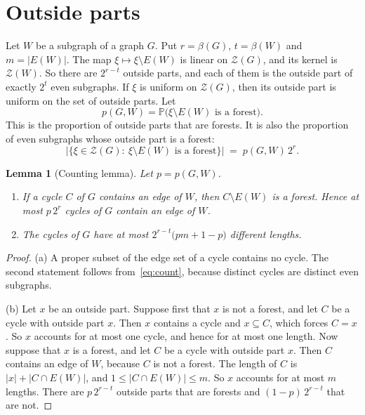 \documentclass[11pt]{article}
\newtheorem{lemma}[theorem]{Lemma}
\theoremstyle{definition}
\theoremstyle{remark}
\newcommand{\Z}{\mathcal{Z}}
\newcommand{\PP}{\mathbb{P}}
\newcommand{\sm}{\setminus}
\numberwithin{equation}{section}
\begin{document}
\section{Outside parts}\label{sec:count}

Let $W$ be a subgraph of a graph $G$. Put $r=\beta(G)$, $t=\beta(W)$ and $m=|E(W)|$. The map
$\xi\mapsto\xi\sm E(W)$ is linear on $\Z(G)$, and its kernel is $\Z(W)$. So there are $2^{r-t}$
outside parts, and each of them is the outside part of exactly $2^{t}$ even subgraphs. If $\xi$ is
uniform on $\Z(G)$, then its outside part is uniform on the set of outside parts. Let
\[
  p(G,W)=\PP\bigl(\xi\sm E(W)\text{ is a forest}\bigr).
\]
This is the proportion of outside parts that are forests. It is also the proportion of even
subgraphs whose outside part is a forest:
\begin{equation}\label{eq:count}
  \bigl|\{\xi\in\Z(G):\ \xi\sm E(W)\text{ is a forest}\}\bigr|\;=\;p(G,W)\,2^{r}.
\end{equation}

\begin{lemma}[Counting lemma]\label{lem:count}
Let $p=p(G,W)$.
\begin{enumerate}
\item[\textup{(a)}] If a cycle $C$ of $G$ contains an edge of $W$, then $C\sm E(W)$ is a forest.
Hence at most $p\,2^{r}$ cycles of $G$ contain an edge of $W$.
\item[\textup{(b)}] The cycles of $G$ have at most $2^{r-t}\bigl(pm+1-p\bigr)$ different lengths.
\end{enumerate}
\end{lemma}

\begin{proof}
(a) A proper subset of the edge set of a cycle contains no cycle. The second statement follows
from~\eqref{eq:count}, because distinct cycles are distinct even subgraphs.

(b) Let $x$ be an outside part. Suppose first that $x$ is not a forest, and let $C$ be a cycle with
outside part $x$. Then $x$ contains a cycle and $x\subseteq C$, which forces $C=x$. So $x$ accounts
for at most one cycle, and hence for at most one length. Now suppose that $x$ is a forest, and let
$C$ be a cycle with outside part $x$. Then $C$ contains an edge of $W$, because $C$ is not a
forest. The length of $C$ is $|x|+|C\cap E(W)|$, and $1\le|C\cap E(W)|\le m$. So $x$ accounts for
at most $m$ lengths. There are $p\,2^{r-t}$ outside parts that are forests and $(1-p)\,2^{r-t}$
that are not.
\end{proof}
\end{document}
